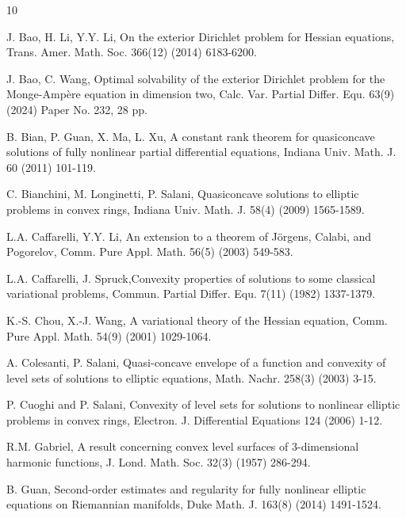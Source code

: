 \documentclass[reqno]{amsart}
\theoremstyle{remark}
\theoremstyle{definition}
\numberwithin{equation}{section}
\begin{document}
\begin{thebibliography}{10}

 J. Bao, H. Li, Y.Y. Li, On the exterior Dirichlet problem for Hessian equations, Trans. Amer. Math. Soc. 366(12) (2014) 6183-6200.

 J. Bao, C. Wang, Optimal solvability of the exterior Dirichlet problem for the Monge-Amp\`ere equation in dimension two, Calc. Var. Partial Differ. Equ. 63(9) (2024) Paper No. 232, 28 pp.

 B. Bian, P. Guan, X. Ma, L. Xu, A constant rank theorem for quasiconcave solutions of fully nonlinear partial 
differential equations, Indiana Univ. Math. J. 60 (2011) 101-119.

 C. Bianchini, M. Longinetti, P. Salani, Quasiconcave solutions to elliptic problems in convex rings,
Indiana Univ. Math. J. 58(4) (2009) 1565-1589.

 L.A. Caffarelli, Y.Y. Li, An extension to a theorem of J\"{o}rgens, Calabi, and Pogorelov, Comm. Pure Appl. Math. 56(5) (2003) 549-583.

 L.A. Caffarelli, J. Spruck,Convexity properties of solutions to some classical variational problems, Commun. Partial Differ. Equ. 7(11) (1982) 1337-1379.

 K.-S. Chou, X.-J. Wang, A variational theory of the Hessian equation, Comm. Pure Appl. Math. 54(9) (2001) 1029-1064.

 A. Colesanti, P. Salani, Quasi-concave envelope of a function and convexity of level sets of solutions to elliptic equations, Math. Nachr. 258(3) (2003) 3-15.

 P. Cuoghi and P. Salani, Convexity of level sets for solutions to nonlinear elliptic problems in convex rings, Electron. J. Differential Equations 124 (2006) 1-12.

 R.M. Gabriel, A result concerning convex level surfaces of 3-dimensional harmonic functions, J. Lond.
Math. Soc. 32(3) (1957) 286-294. 

 B. Guan, Second-order estimates and regularity for fully nonlinear elliptic equations on Riemannian manifolds, Duke Math. J. 163(8) (2014) 1491-1524.


\end{thebibliography}
\end{document}
